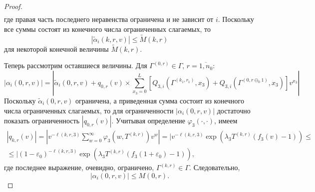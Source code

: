 \documentclass{report}
\begin{document}
\begin{proof}
\begin{multline*}
\end{multline*}
где правая часть последнего неравенства ограничена и не зависит от $i$.
Поскольку все суммы состоят из конечного числа ограниченных слагаемых, то
\begin{equation*}
|\tilde{\alpha}_i(k,r,v) | \leqslant \tilde{M}(k,r)
\end{equation*}
для некоторой конечной величины $\tilde{M}(k,r)$.

Теперь рассмотрим оставшиеся величины. Для $\Gamma^{(0,r)} \in \Gamma$, $r=\overline{1,n_0}$:
\begin{equation*}
|\alpha_i(0,r,v)| = | \tilde{\alpha}_i(0,r,v) + q_{0,r}(v) \times \sum_{x_3=0}^{L} \left[ Q_{3,i}(\Gamma^{(k_1,r_1)},x_3) + Q_{3,i}(\Gamma^{(0,r\ominus_0 1)},x_3) \right] v^{x_3}|
\end{equation*}
Поскольку $\tilde{\alpha}_i(0,r,v)$ ограничена, а приведенная сумма состоит из конечного числа ограниченных слагаемых, то для ограниченности $|\alpha_i(0,r,v)| $ достаточно показать ограниченность $|q_{0,r}(v)|$. Учитывая определение $\varphi_3(\cdot,\cdot)$, имеем
\begin{multline*}
|q_{k,r}(v)| = | v^{-\ell(k,r,3)}\sum_{w=0}^{\infty} \varphi_3(w,T^{(k,r)})v^w| = | v^ {-\ell(k,r,3)} \exp{(\lambda_3 T^{(k,r)} (f_3(v) - 1))}
\leqslant \\ 
\leqslant | (1-\varepsilon_0) ^ {-\ell(k,r,3)} \exp{(\lambda_3 T^{(k,r)} (f_3(1+\varepsilon_0) - 1))},
\end{multline*}
где последнее выражение, очевидно, ограничено, $\Gamma^{(k,r)} \in \Gamma$. Следовательно,
\begin{equation*}
|\alpha_i(0,r,v)| \leqslant M(0,r).
\end{equation*}


\end{proof}
\end{document}
